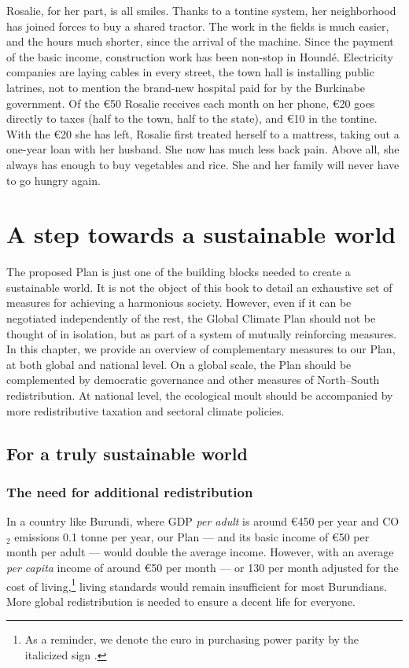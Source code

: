 \documentclass[a5paper,english,openany]{memoir}
\begin{document}
Rosalie, for her part, is all smiles. Thanks to a tontine system, her neighborhood has joined forces to buy a shared tractor. The work in the fields is much easier, and the hours much shorter, since the arrival of the machine. Since the payment of the basic income, construction work has been non-stop in Houndé. Electricity companies are laying cables in every street, the town hall is installing public latrines, not to mention the brand-new hospital paid for by the Burkinabe government. Of the \euro{}50 Rosalie receives each month on her phone, \euro{}20 goes directly to taxes (half to the town, half to the state), and \euro{}10 %
in the tontine. With the \euro{}20 she has left, Rosalie first treated herself to a mattress, taking out a one-year loan with her husband. She now has much less back pain. Above all, she always has enough to buy vegetables and rice. She and her family will never have to go hungry again.


\chapter{A step towards a sustainable world}\label{ch:premier_pas} %

The proposed Plan is just one of the building blocks needed to create a sustainable world. It is not the object of this book %
to detail an exhaustive set of measures for achieving a harmonious society. However, even if it can be negotiated independently of the rest, the Global Climate Plan should not be thought of in isolation, but as part of a system of mutually reinforcing measures. In this chapter, we provide an overview of complementary measures to our Plan, at both global and national level. On a global scale, the Plan should be complemented by democratic governance and other measures of North--South redistribution. At national level, the ecological moult should be accompanied by more redistributive taxation and sectoral climate policies. 

\section{For a truly sustainable world}

\subsection{The need for additional redistribution}
In a country like Burundi, where GDP \textit{per adult} is around \euro{}450 per year and CO$_\text{2}$ emissions 0.1 tonne per year, our Plan --- and its basic income of \euro{}50 per month per adult --- would double the average income. 
However, with an average \textit{per capita} income of around \euro{}50 per month --- or \textit{\texteuro{}}130 per month adjusted for the cost of living,\footnote{As a reminder, we denote the euro in purchasing power parity by the italicized sign \textit{\texteuro{}}.} 
living standards would remain insufficient for most Burundians. More global redistribution is needed to ensure a decent life for everyone. 
\end{document}
